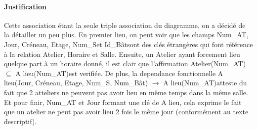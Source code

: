 \documentclass[a4paper, 12pt]{article}
\begin{document}
            \paragraph{Justification}Cette association étant la seule triple association du diagramme, on a décidé de la détailler un peu plus. En premier lieu, on peut voir que les champs \og Num\_AT\fg, \og Jour\fg, \og Créneau\fg, \og Etage\fg, \og Num\_S\fg et \og Id\_Bât\fg sont des clés étrangères qui font référence à la relation Atelier, Horaire et Salle. Ensuite, un Atelier ayant forcement lieu quelque part à un horaire donné, il est clair que l'affirmation \og Atelier(Num\_AT) $\subseteq$ A lieu(Num\_AT)\fg est verifiée.
            De plus, la dependance fonctionnelle \og A lieu(Jour, Créneau, Etage, Num\_S, Num\_Bât) $\rightarrow$ A lieu(Num\_AT)\fg atteste du fait que 2 atteliers ne peuvent pas avoir lieu en même temps dans la même salle.
            Et pour finir, Num\_AT et Jour formant une clé de A lieu, cela exprime le fait que un atelier ne peut pas avoir lieu 2 fois le même jour (conformément au texte descriptif).

        
\end{document}
